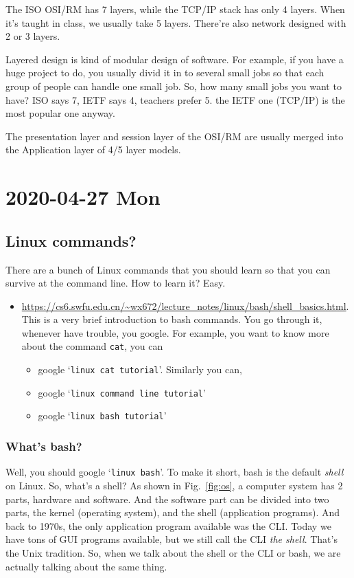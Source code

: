 \documentclass{article}
\begin{document}
The ISO OSI/RM has 7 layers, while the TCP/IP stack has only 4 layers. When it's taught in class, we usually take 5 layers. There're also network designed with 2 or 3 layers.

Layered design is kind of modular design of software. For example, if you have a huge
project to do, you usually divid it in to several small jobs so that each group of people
can handle one small job. So, how many small jobs you want to have? ISO says 7, IETF says
4, teachers prefer 5. the IETF one (TCP/IP) is the most popular one anyway.

The presentation layer and session layer of the OSI/RM are usually merged into the Application layer of 4/5 layer models.

\section{2020-04-27 Mon}
\label{sec:2020-04-27-1}

\subsection{Linux commands?}
\label{sec:linux-commands}

There are a bunch of Linux commands that you should learn so that you can survive at the
command line. How to learn it? Easy.
\begin{itemize}
\item
  \url{https://cs6.swfu.edu.cn/~wx672/lecture_notes/linux/bash/shell_basics.html}. This is
  a very brief introduction to bash commands. You go through it, whenever have trouble,
  you google. For example, you want to know more about the command \texttt{cat}, you can
  \begin{itemize}
  \item google `\texttt{linux cat tutorial}'. Similarly you can,
  \item google `\texttt{linux command line tutorial}'
  \item google `\texttt{linux bash tutorial}'
  \end{itemize}
\end{itemize}

\subsubsection{What's bash?}
\label{sec:whats-bash}

Well, you should google `\texttt{linux bash}'. To make it short, bash is the default
\emph{shell} on Linux. So, what's a shell? As shown in Fig.~\ref{fig:os}, a computer
system has 2 parts, hardware and software. And the software part can be divided into two
parts, the kernel (operating system), and the shell (application programs). And back to
1970s, the only application program available was the CLI. Today we have tons of GUI
programs available, but we still call the CLI \emph{the shell}. That's the Unix tradition.
So, when we talk about the shell or the CLI or bash, we are actually talking about the
same thing.
\end{document}
